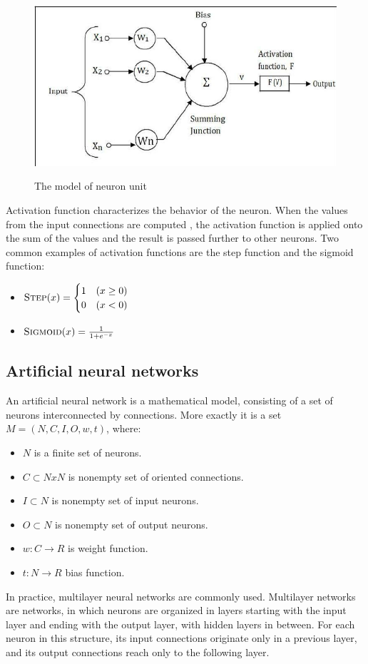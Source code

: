 \begin{figure}
\centering
\includegraphics[width=.5\linewidth]{ext/neuron.png}
\label{fig:neuron}
\caption{The model of neuron unit}
\end{figure}

Activation function characterizes the behavior of the neuron. When the values from the input connections are computed , the activation function is applied onto the sum of the values and the result is passed further to other neurons. Two common examples of activation functions are the step function and the sigmoid function:

\begin{itemize}
\item $\textsc{Step}(x)=\begin{cases} 1 & (x \geq 0) \\ 0 & (x < 0) \end{cases}$
\item $\textsc{Sigmoid}(x) = \frac{1}{1+e^{-x}} $
\end{itemize}

\subsection{Artificial neural networks}
An artificial neural network is a mathematical model, consisting of a set of neurons interconnected by connections.
More exactly it is a set 
$M  =  (N,C,I,O,w,t)$,  where:
\begin{itemize}
\item $N$  is  a  finite  set  of  neurons.
\item $C \subset N x N$  is  nonempty  set  of  oriented  connections.
\item $I \subset N$  is  nonempty  set  of  input  neurons.
\item $O \subset N$  is  nonempty  set  of  output  neurons.
\item $w : C \to R$  is  weight  function.
\item $t : N\to R$  bias  function.
\end{itemize}

In practice, multilayer neural networks are commonly used. Multilayer networks are networks, in which  neurons are organized in layers starting with the input layer and ending with the output layer, with hidden layers in between. For each neuron in this structure, its input connections originate only in a  previous layer, and its output connections reach only to the following layer. 

